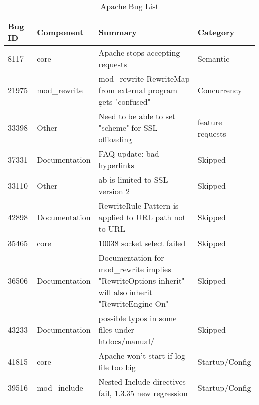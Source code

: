 \begin{longtable}[c]{llll}
\caption{Apache Bug List}
\label{tab:apachebuglist}\\
Bug ID & Component          & Summary                                                                                                        & Category          \\
\endfirsthead
%
\endhead
%

8117   & core               & Apache stops accepting requests                                                                                & Semantic          \\
21975  & mod\_rewrite       & mod\_rewrite RewriteMap from external program gets "confused"                                                  & Concurrency       \\
33398  & Other              & Need to be able to set "scheme" for SSL offloading                                                             & feature requests  \\
37331  & Documentation      & FAQ update: bad hyperlinks                                                                                     & Skipped           \\
33110  & Other              & ab is limited to SSL version 2                                                                                 & Skipped           \\
42898  & Documentation      & RewriteRule Pattern  is applied to URL path not to URL                                                         & Skipped           \\
35465  & core               & 10038 socket select failed                                                                                     & Skipped           \\
36506  & Documentation      & Documentation for mod\_rewrite implies "RewriteOptions inherit" will also inherit "RewriteEngine On"           & Skipped           \\
43233  & Documentation      & possible typos in some files under htdocs/manual/                                                              & Skipped           \\
41815  & core               & Apache won't start if log file too big                                                                         & Startup/Config    \\
39516  & mod\_include       & Nested Include directives fail, 1.3.35 new regression                                                          & Startup/Config    \\

\end{longtable}
